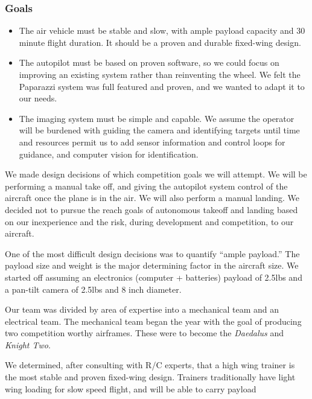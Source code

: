 \documentclass[10pt]{report}
\begin{document}
\subsubsection{Goals}
\begin{itemize}
	\item The air vehicle must be stable and slow, with ample payload capacity and 30 minute flight duration. It should be a proven and durable fixed-wing design.
	\item The autopilot must be based on proven software, so we could focus on improving an existing system rather than reinventing the wheel. We felt the Paparazzi system was full featured and proven, and we wanted to adapt it to our needs.
	\item The imaging system must be simple and capable. We assume the operator will be burdened with guiding the camera and identifying targets until time and resources permit us to add sensor information and control loops for guidance, and computer vision for identification.
\end{itemize}

We made design decisions of which competition goals we will attempt. 
We will be performing a manual take off, and giving the autopilot system control of the aircraft once the plane is in the air. We will also perform a manual landing. We decided not to pursue the reach goals of autonomous takeoff and landing based on our inexperience and the risk, during development and competition, to our aircraft.

One of the most difficult design decisions was to quantify ``ample payload.'' The payload size and weight is the major determining factor in the aircraft size.
We started off assuming an electronics (computer + batteries) payload of 2.5lbs and a pan-tilt camera of 2.5lbs and 8 inch diameter.


Our team was divided by area of expertise into a mechanical team and an electrical team.
The mechanical team began the year with the goal of producing two competition worthy airframes. These were to become the \emph{Daedalus} and \emph{Knight Two}.

We determined, after consulting with R/C experts, that a high wing trainer is the most stable and proven fixed-wing design. Trainers traditionally have light wing loading for slow speed flight, and will be able to carry payload 
\end{document}
